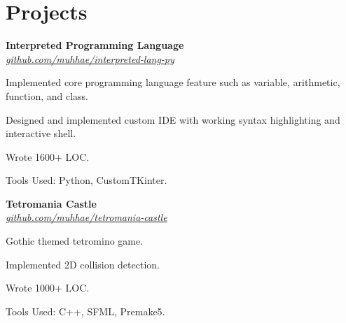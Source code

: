 \section{Projects}
    \begin{twocolentry}{
    }
    \textbf{Interpreted Programming Language}\\
    \textit{\href{https://github.com/muhhae/interpreted-lang-py}{github.com/muhhae/interpreted-lang-py}}
    \end{twocolentry}

    \vspace{0.10 cm}
    \begin{onecolentry}
        \begin{highlights}
            \item Implemented core programming language feature such as variable, arithmetic, function,
                and class.
            \item Designed and implemented custom IDE with working syntax highlighting and interactive shell.
            \item Wrote 1600+ LOC.
            \item Tools Used: Python, CustomTKinter.
        \end{highlights}
    \end{onecolentry}

    \vspace{0.2 cm}

    \begin{twocolentry}{
    }
    \textbf{Tetromania Castle}\\
    \textit{\href{https://github.com/muhhae/tetromania-castle}{github.com/muhhae/tetromania-castle}}
    \end{twocolentry}

    \vspace{0.10 cm}
    \begin{onecolentry}
        \begin{highlights}
            \item Gothic themed tetromino game.
            \item Implemented 2D collision detection.
            \item Wrote 1000+ LOC.
            \item Tools Used: C++, SFML, Premake5.
        \end{highlights}
    \end{onecolentry}

    \vspace{0.2 cm}

